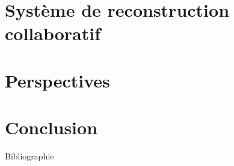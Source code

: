 \documentclass[hyperref={pdfpagelabels=false}]{beamer}
\begin{document}
    \section{Système de reconstruction collaboratif}
    \begin{frame}
        
    \end{frame}

    \section{Perspectives}
    \begin{frame}
        
    \end{frame}

    \section{Conclusion}
    \begin{frame}
        
    \end{frame}

    \begin{frame}{Bibliographie}
        
        
    \end{frame}
\end{document}
